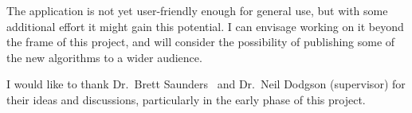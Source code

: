 The application is not yet user-friendly enough for general use, but with some additional effort
it might gain this potential. I can envisage working on it beyond the frame of this project,
and will consider the possibility of publishing some of the new algorithms to a wider audience.

I would like to thank Dr.~Brett Saunders~\cite{Saunders} and Dr.~Neil Dodgson (supervisor) for
their ideas and discussions, particularly in the early phase of this project.
